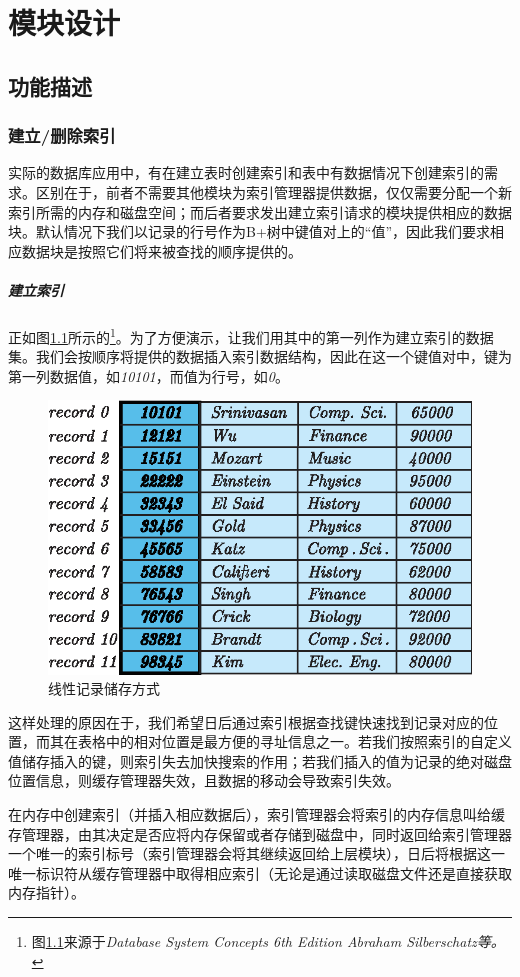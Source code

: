 \documentclass[UTF8]{ctexrep} %
\begin{document}
\chapter{模块设计}
\section{功能描述}
\subsection{建立/删除索引}
实际的数据库应用中，有在建立表时创建索引和表中有数据情况下创建索引的需求。区别在于，前者不需要其他模块为索引管理器提供数据，仅仅需要分配一个新索引所需的内存和磁盘空间；而后者要求发出建立索引请求的模块提供相应的数据块。默认情况下我们以记录的行号作为B+树中键值对上的“值”，因此我们要求相应数据块是按照它们将来被查找的顺序提供的。
\paragraph{建立索引}
正如图\ref{fig:index_example}所示的\footnote{图\ref{fig:index_example}来源于\textit{Database System Concepts 6th Edition Abraham Silberschatz等。}}。为了方便演示，让我们用其中的第一列作为建立索引的数据集。我们会按顺序将提供的数据插入索引数据结构，因此在这一个键值对中，键为第一列数据值，如\textit{10101}，而值为行号，如\textit{0}。
\begin{figure}[H]
    \centering
    \includegraphics[width=0.7\linewidth]{figure/index_example.eps}
    \caption{线性记录储存方式}
    \label{fig:index_example}
\end{figure}

这样处理的原因在于，我们希望日后通过索引根据查找键快速找到记录对应的位置，而其在表格中的相对位置是最方便的寻址信息之一。若我们按照索引的自定义值储存插入的键，则索引失去加快搜索的作用；若我们插入的值为记录的绝对磁盘位置信息，则缓存管理器失效，且数据的移动会导致索引失效。
\par
在内存中创建索引（并插入相应数据后），索引管理器会将索引的内存信息叫给缓存管理器，由其决定是否应将内存保留或者存储到磁盘中，同时返回给索引管理器一个唯一的索引标号（索引管理器会将其继续返回给上层模块），日后将根据这一唯一标识符从缓存管理器中取得相应索引（无论是通过读取磁盘文件还是直接获取内存指针）。
\end{document}
